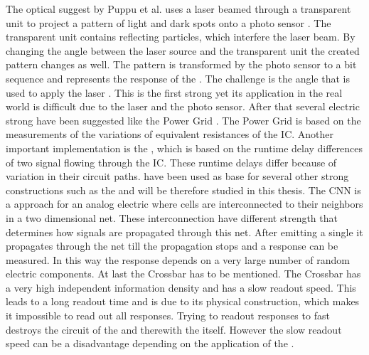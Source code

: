 The optical \puf suggest by Puppu et al. uses a laser beamed through a transparent unit to project a pattern of light and dark spots onto a photo sensor \cite{Pappu2002PhysicalFunctions}.
The transparent unit contains reflecting particles, which interfere the laser beam.
By changing the angle between the laser source and the transparent unit the created pattern changes as well.
The pattern is transformed by the photo sensor to a bit sequence and represents the response of the \puf.
The challenge is the angle that is used to apply the laser \cite{Pappu2002PhysicalFunctions}.
This is the first strong \puf yet its application in the real world is difficult due to the laser and the photo sensor.
After that several electric strong \puf have been suggested like the Power Grid \puf.
The Power Grid \puf is based on the measurements of the variations of equivalent resistances of the \ac{IC}. %
Another important implementation is the \apuf, which is based on the runtime delay differences of two signal flowing through the \ac{IC}.
These runtime delays differ because of variation in their circuit paths.
\apufs have been used as base for several other strong \puf constructions such as the \xpuf and will be therefore studied in this thesis. %
The \ac{CNN} \puf is a approach for an analog electric \puf where cells are interconnected to their neighbors in a two dimensional net.
These interconnection have different strength that determines how signals are propagated through this net.
After emitting a single it propagates through the net till the propagation stops and a response can be measured.
In this way the response depends on a very large number of random electric components. %
At last the Crossbar \puf has to be mentioned.
The Crossbar \puf has a very high independent information density and has a slow readout speed.
This leads to a long readout time and is due to its physical construction, which makes it impossible to read out all responses. 
Trying to readout responses to fast destroys the circuit of the \puf and therewith the \puf itself.
However the slow readout speed can be a disadvantage depending on the application of the \puf. %

